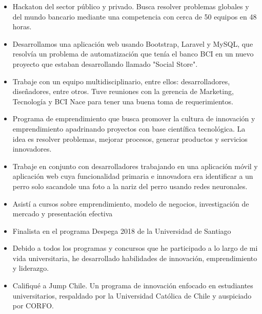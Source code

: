 \documentclass[10pt,a4paper,ragged2e]{altacv}
\begin{document}
\divider

\begin{itemize}
\item Hackaton del sector público y privado. Busca resolver problemas globales y del mundo bancario mediante una competencia con cerca de 50 equipos en 48 horas.
\smallskip
\item Desarrollamos una aplicación web usando Bootstrap, Laravel y MySQL, que resolvía un problema de automatización que tenía el banco BCI en un nuevo proyecto que estaban desarrollando llamado "Social Store".
\item Trabaje con un equipo multidisciplinario, entre ellos: desarrolladores, diseñadores, entre otros. Tuve reuniones con la gerencia de Marketing, Tecnología y BCI Nace para tener una buena toma de requerimientos.
\end{itemize}

\divider

\begin{itemize}
\item Programa de emprendimiento que busca promover la cultura de innovación y emprendimiento apadrinando proyectos con base científica tecnológica. La idea es resolver problemas, mejorar procesos, generar productos y servicios innovadores.
\smallskip
\item Trabaje en conjunto con desarrolladores trabajando en una aplicación móvil y aplicación web cuya funcionalidad primaria e innovadora era identificar a un perro solo sacandole una foto a la nariz del perro usando redes neuronales.
\item Asistí a cursos sobre emprendimiento, modelo de negocios, investigación de mercado y presentación efectiva
\end{itemize}


\smallskip
\begin{itemize}
\item Finalista en el programa Despega 2018 de la Universidad de Santiago
\smallskip
\item Debido a todos los programas y concursos que he participado a lo largo de mi vida universitaria, he desarrollado habilidades de innovación, emprendimiento y liderazgo.
\smallskip
\item Califiqué a Jump Chile. Un programa de innovación enfocado en estudiantes universitarios, respaldado por la Universidad Católica de Chile y auspiciado por CORFO.
\end{itemize}
\end{document}
